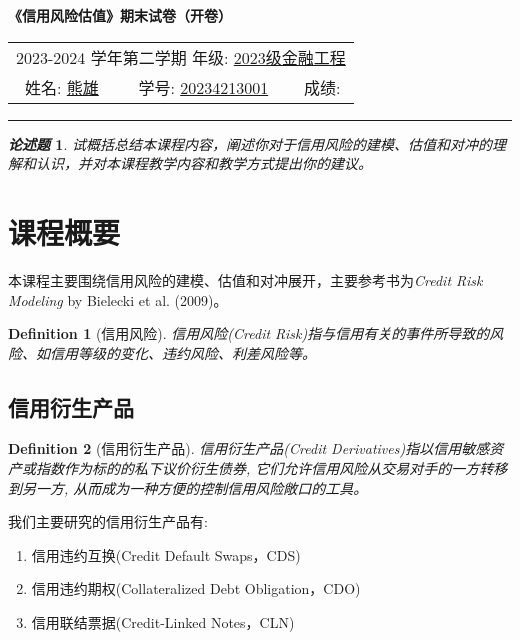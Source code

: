 \documentclass{article}
\newtheorem{definition}{Definition}
\newtheorem*{problem}{\itshape 论述题}
\begin{document}
\vspace{1em}
\begin{center}
\textbf{\LARGE 《信用风险估值》期末试卷（开卷）}\par
\vspace{6pt}
\end{center}

\renewcommand{\arraystretch}{1.4} %
\begin{center}
  \large
  \begin{tabular}{c c c}
    \multicolumn{3}{c}{2023-2024 学年第二学期 \hspace{3em} 年级: \underline{\hspace{0.5cm}2023级金融工程\hspace{0.5cm}}} \\
    姓名: \underline{\hspace{1cm}熊雄\hspace{1cm}} & 学号: \underline{\hspace{0.5cm}20234213001\hspace{0.5cm}} & 成绩: \underline{\hspace{3cm}} \\
\end{tabular}
\end{center}

\hrule height 1pt
\begin{problem}
  试概括总结本课程内容，阐述你对于信用风险的建模、估值和对冲的理解和认识，并对本课程教学内容和教学方式提出你的建议。 
\end{problem}
\section{课程概要}

本课程主要围绕信用风险的建模、估值和对冲展开，主要参考书为\textit{Credit Risk Modeling} by Bielecki et al. (2009)。
\begin{definition}[信用风险]
  信用风险(Credit Risk)指与信用有关的事件所导致的风险、如信用等级的变化、违约风险、利差风险等。
\end{definition}


\subsection{信用衍生产品}
\begin{definition}[信用衍生产品]
  信用衍生产品(Credit Derivatives)指以信用敏感资产或指数作为标的的私下议价衍生债券, 它们允许信用风险从交易对手的一方转移到另一方, 从而成为一种方便的控制信用风险敞口的工具。
\end{definition}
我们主要研究的信用衍生产品有:
\begin{enumerate}
  \item 信用违约互换(Credit Default Swaps，CDS)
  \item 信用违约期权(Collateralized Debt Obligation，CDO)
  \item 信用联结票据(Credit-Linked Notes，CLN)
\end{enumerate}
\end{document}
